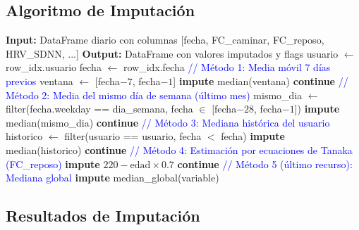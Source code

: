 \documentclass[12pt,letterpaper,twoside]{report}
\begin{document}
\subsection{Algoritmo de Imputación}

\begin{algorithm}[H]
\caption{Imputación Jerárquica para Variables Cardiovasculares}
\label{alg:hierarchical_imputation}
\begin{algorithmic}[1]
\State \textbf{Input:} DataFrame diario con columnas [fecha, FC\_caminar, FC\_reposo, HRV\_SDNN, ...]
\State \textbf{Output:} DataFrame con valores imputados y flags
\State
{}
        \State usuario $\gets$ row\_idx.usuario
        \State fecha $\gets$ row\_idx.fecha
        \State
        \State \textcolor{blue}{// Método 1: Media móvil 7 días previos}
        \State ventana $\gets$ [fecha$-7$, fecha$-1$]
            \State \textbf{impute} median(ventana) 
            \State \textbf{continue}
        \EndIf
        \State
        \State \textcolor{blue}{// Método 2: Media del mismo día de semana (último mes)}
        \State mismo\_dia $\gets$ filter(fecha.weekday == dia\_semana, fecha $\in$ [fecha$-28$, fecha$-1$])
            \State \textbf{impute} median(mismo\_dia)
            \State \textbf{continue}
        \EndIf
        \State
        \State \textcolor{blue}{// Método 3: Mediana histórica del usuario}
        \State historico $\gets$ filter(usuario == usuario, fecha $<$ fecha)
            \State \textbf{impute} median(historico)
            \State \textbf{continue}
        \EndIf
        \State
        \State \textcolor{blue}{// Método 4: Estimación por ecuaciones de Tanaka (FC\_reposo)}
            \State \textbf{impute} $220 - \text{edad} \times 0.7$ 
            \State \textbf{continue}
        \EndIf
        \State
        \State \textcolor{blue}{// Método 5 (último recurso): Mediana global}
        \State \textbf{impute} median\_global(variable)
    \EndFor
\EndFor
\end{algorithmic}
\end{algorithm}

\subsection{Resultados de Imputación}
\end{document}
